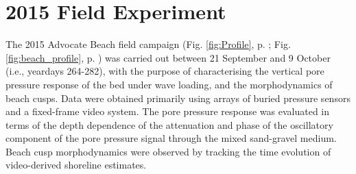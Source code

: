 






\section{2015 Field Experiment}\label{Intro:Adv2015}

The 2015 Advocate Beach field campaign (Fig. \ref{fig:Profile}, p. \pageref{fig:Profile}; Fig. \ref{fig:beach_profile}, p. \pageref{fig:beach_profile}) was carried out between 21 September and 9 October (i.e., yeardays 264-282), with the purpose of characterising the vertical pore pressure response of the bed under wave loading, and the morphodynamics of beach cusps. Data were obtained primarily using arrays of buried pressure sensors and a fixed-frame video system. The pore pressure response was evaluated in terms of the depth dependence of the attenuation and phase of the oscillatory component of the pore pressure signal through the mixed sand-gravel medium. Beach cusp morphodynamics were observed by tracking the time evolution of video-derived shoreline estimates.

